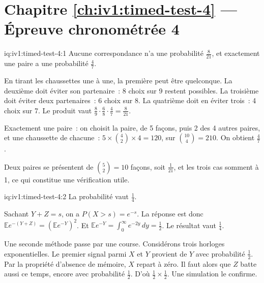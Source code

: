 \section*{Chapitre \ref{ch:iv1:timed-test-4} --- Épreuve chronométrée 4}

\begin{solution}{iq:iv1:timed-test-4:1}
Aucune correspondance n'a une probabilité $\frac{8}{21}$, et exactement une paire a une probabilité $\frac47$.

En tirant les chaussettes une à une, la première peut être quelconque. La deuxième doit éviter son partenaire~: 8 choix sur 9 restent possibles. La troisième doit éviter deux partenaires~: 6 choix sur 8. La quatrième doit en éviter trois~: 4 choix sur 7. Le produit vaut $\frac89 \cdot \frac68 \cdot \frac47 = \frac{8}{21}$.

Exactement une paire~: on choisit la paire, de 5 façons, puis 2 des 4 autres paires, et une chaussette de chacune~: $5 \times \binom42 \times 4 = 120$, sur $\binom{10}{4} = 210$. On obtient $\frac47$.

Deux paires se présentent de $\binom52 = 10$ façons, soit $\frac{1}{21}$, et les trois cas somment à 1, ce qui constitue une vérification utile.

\end{solution}

\begin{solution}{iq:iv1:timed-test-4:2}
La probabilité vaut $\frac14$.

Sachant $Y + Z = s$, on a $P(X > s) = e^{-s}$. La réponse est donc $\mathbb{E}e^{-(Y + Z)} = (\mathbb{E}e^{-Y})^2$. Et $\mathbb{E}e^{-Y} = \int_0^\infty e^{-2y}\,dy = \frac12$. Le résultat vaut $\frac14$.

Une seconde méthode passe par une course. Considérons trois horloges exponentielles. Le premier signal parmi $X$ et $Y$ provient de $Y$ avec probabilité $\frac12$. Par la propriété d'absence de mémoire, $X$ repart à zéro. Il faut alors que $Z$ batte aussi ce temps, encore avec probabilité $\frac12$. D'où $\frac12 \times \frac12$. Une simulation le confirme.

\end{solution}

